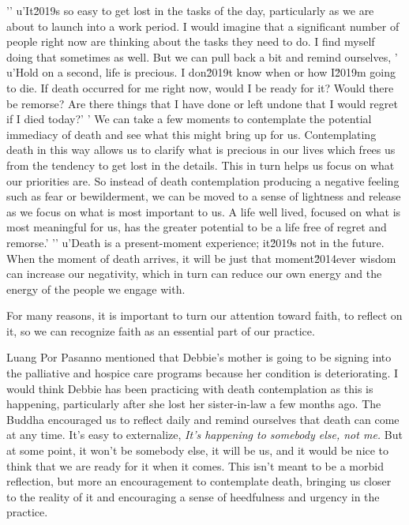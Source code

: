 '\n'
u'It\u2019s so easy to get lost in the tasks of the day, particularly as we are about to launch into a work period. I would imagine that a significant number of people right now are thinking about the tasks they need to do. I find myself doing that sometimes as well. But we can pull back a bit and remind ourselves, '
u'Hold on a second, life is precious. I don\u2019t know when or how I\u2019m going to die. If death occurred for me right now, would I be ready for it? Would there be remorse? Are there things that I have done or left undone that I would regret if I died today?'
' We can take a few moments to contemplate the potential immediacy of death and see what this might bring up for us. Contemplating death in this way allows us to clarify what is precious in our lives which frees us from the tendency to get lost in the details. This in turn helps us focus on what our priorities are. So instead of death contemplation producing a negative feeling such as fear or bewilderment, we can be moved to a sense of lightness and release as we focus on what is most important to us. A life well lived, focused on what is most meaningful for us, has the greater potential to be a life free of regret and remorse.'
'\n'
u'Death is a present-moment experience; it\u2019s not in the future. When the moment of death arrives, it will be just that moment\u2014ever wisdom can increase our negativity, 
which in turn can reduce our own energy and the energy of the people we 
engage with.

For many reasons, it is important to turn our attention toward faith, 
to reflect on it, so we can recognize faith as an essential part of our 
practice.


Luang Por Pasanno mentioned that Debbie's mother is going to be signing 
into the palliative and hospice care programs because her condition is 
deteriorating. I would think Debbie has been practicing with death 
contemplation as this is happening, particularly after she lost her 
sister-in-law a few months ago. The Buddha encouraged us to reflect 
daily and remind ourselves that death can come at any time. It's easy 
to externalize, \emph{It's happening to somebody else, not me.} But at 
some point, it won't be somebody else, it will be us, and it would be 
nice to think that we are ready for it when it comes. This isn't meant 
to be a morbid reflection, but more an encouragement to contemplate 
death, bringing us closer to the reality of it and encouraging a sense 
of heedfulness and urgency in the practice.

